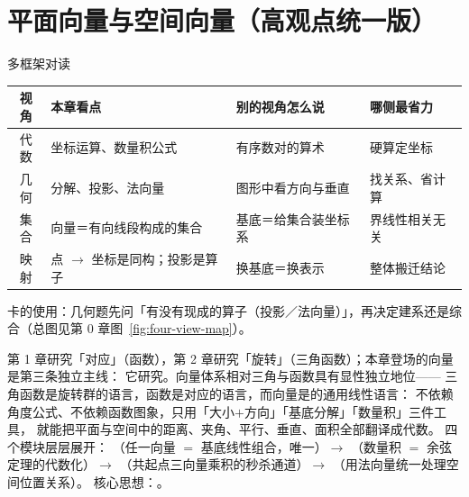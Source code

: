 
\section{平面向量与空间向量（高观点统一版）}

\begin{methodbox}{多框架对读}
\small
\begin{center}
\begin{tabular}{c|p{2.9cm}|p{5.0cm}|p{3.1cm}}
\toprule
视角 & 本章看点 & 别的视角怎么说 & 哪侧最省力 \\
\midrule
代数 & 坐标运算、数量积公式 & 有序数对的算术 & 硬算定坐标 \\
几何 & 分解、投影、法向量 & 图形中看方向与垂直 & 找关系、省计算 \\
集合 & 向量＝有向线段构成的集合 & 基底＝给集合装坐标系 & 界线性相关无关 \\
映射 & 点 $\to$ 坐标是同构；投影是算子 & 换基底＝换表示 & 整体搬迁结论 \\
\bottomrule
\end{tabular}
\end{center}
卡的使用：几何题先问「有没有现成的算子（投影／法向量）」，再决定建系还是综合（总图见第 0 章图~\ref{fig:four-view-map}）。
\end{methodbox}

第 1 章研究「对应」（函数），第 2 章研究「旋转」（三角函数）；本章登场的向量是第三条独立主线：
它研究。向量体系相对三角与函数具有显性独立地位——
三角函数是旋转群的语言，函数是对应的语言，而向量是的通用线性语言：
不依赖角度公式、不依赖函数图象，只用「大小$+$方向」「基底分解」「数量积」三件工具，
就能把平面与空间中的距离、夹角、平行、垂直、面积全部翻译成代数。
四个模块层层展开：
（任一向量 $=$ 基底线性组合，唯一）$\to$
（数量积 $=$ 余弦定理的代数化）$\to$
（共起点三向量乘积的秒杀通道）$\to$
（用法向量统一处理空间位置关系）。
核心思想：。

